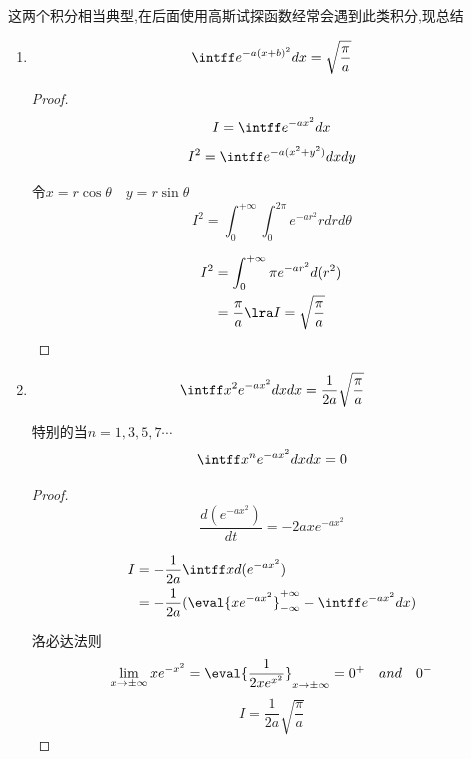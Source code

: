         
            \begin{formal}
        这两个积分相当典型,在后面使用高斯试探函数经常会遇到此类积分,现总结
        

        \begin{enumerate}
            \item 
                $$ \intff e^{-a (x+b)^{2}} dx = \sqrt{\frac{\pi}{a}} $$
            \begin{proof}
                \pfindent 

                $$I=\intff e^{-a x^{2}} dx$$
                $$I^{2}= \intff e^{-a (x^{2}+y^{2})} dx dy $$

                令$x=r\cos{\theta} \quad y=r\sin{\theta}$
                $$ I^{2} = \int_{0}^{+\infty} \int_{0}^{2\pi} e^{-a r^{2}} rdrd\theta $$
               
                \begin{align*}
                    I^{2} &= \int_{0}^{+\infty} \pi  e^{-a r^{2}}d(r^{2})   \\
                          &= \frac{\pi}{a}  \lra I = \sqrt{\frac{\pi}{a}} 
                \end{align*}
            
            \end{proof}

            \item 
                $$ \intff x^{2} e^{-a x^{2}} dxdx = \frac{1}{2a} \sqrt{\frac{\pi}{a}} $$

                特别的当$n=1,3,5,7\cdots$
                $$ \intff x^{n} e^{-a x^{2}} dxdx = 0 $$

                \begin{proof}
                    \pfindent
                    $$ \frac{d(e^{-a x^{2}})}{dt} = -2a x e^{-a x^{2}} $$
                    
                    \begin{align*}
                        I &= -\frac{1}{2a} \intff x d(e^{-a x^{2}})                                         \\
                          &= -\frac{1}{2a} (\eval{x e^{-a x^{2}}}_{-\infty}^{+\infty} - \intff e^{-a x^{2}}dx )
                    \end{align*}

                    洛必达法则
                    $$ \lim_{x \to \pm \infty} x e^{-x^{2}} = \eval{\frac{1}{2x e^{x^{2}}}}_{x \to \pm \infty} = 0^{+} \quad and \quad 0^{-} $$ 
                    $$ I = \frac{1}{2a} \sqrt{\frac{\pi}{a}}$$


\end{proof}
\end{enumerate}
\end{formal}
